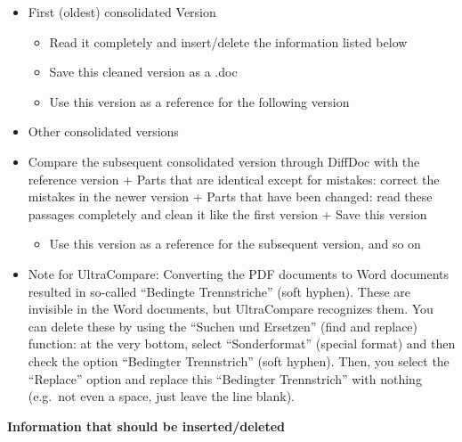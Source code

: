 \documentclass[10pt,]{article}
\providecommand{\tightlist}{%
  \setlength{\itemsep}{0pt}\setlength{\parskip}{0pt}}
\begin{document}
\begin{itemize}
\tightlist
\item
  First (oldest) consolidated Version

  \begin{itemize}
  \tightlist
  \item
    Read it completely and insert/delete the information listed below
  \item
    Save this cleaned version as a .doc
  \item
    Use this version as a reference for the following version
  \end{itemize}
\item
  Other consolidated versions
\item
  Compare the subsequent consolidated version through DiffDoc with the
  reference version + Parts that are identical except for mistakes:
  correct the mistakes in the newer version + Parts that have been
  changed: read these passages completely and clean it like the first
  version + Save this version

  \begin{itemize}
  \tightlist
  \item
    Use this version as a reference for the subsequent version, and so
    on
  \end{itemize}
\item
  Note for UltraCompare: Converting the PDF documents to Word documents
  resulted in so-called ``Bedingte Trennstriche'' (soft hyphen). These
  are invisible in the Word documents, but UltraCompare recognizes them.
  You can delete these by using the ``Suchen und Ersetzen'' (find and
  replace) function: at the very bottom, select ``Sonderformat''
  (special format) and then check the option ``Bedingter Trennstrich''
  (soft hyphen). Then, you select the ``Replace'' option and replace
  this ``Bedingter Trennstrich'' with nothing (e.g.~not even a space,
  just leave the line blank).
\end{itemize}

\textbf{Information that should be inserted/deleted}
\end{document}
